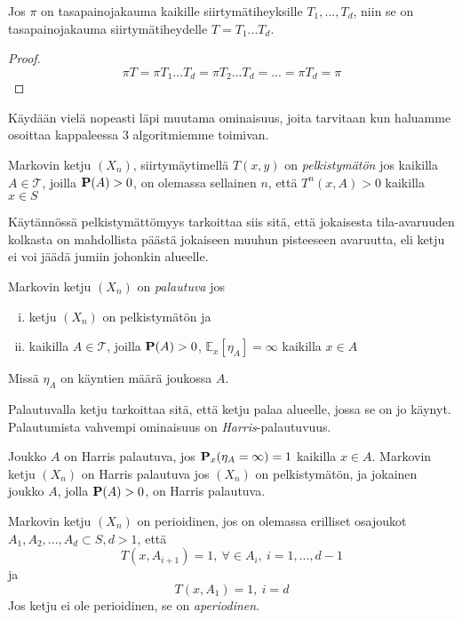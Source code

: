\begin{lause}\label{cyclic-kernel}
	Jos $\pi$ on tasapainojakauma kaikille siirtymätiheyksille $T_1,...,T_d$, niin se on tasapainojakauma siirtymätiheydelle $T = T_1...T_d$.
\end{lause}

\begin{proof}
	\begin{equation*}
		\pi T = \pi T_1...T_d = \pi T_2...T_d = ... = \pi T_d = \pi
	\end{equation*}
\end{proof}

Käydään vielä nopeasti läpi muutama ominaisuus, joita tarvitaan kun haluamme osoittaa kappaleessa 3 algoritmiemme toimivan.

\begin{maar}
	Markovin ketju $(X_n)$, siirtymäytimellä $T(x,y)$ on \textit{pelkistymätön} jos kaikilla $A \in \mathcal{T}$, joilla $\textbf{P}(A)>0$, on olemassa sellainen $n$, että $T^n(x, A)>0$ kaikilla $x\in S$
\end{maar} 

Käytännössä pelkistymättömyys tarkoittaa siis sitä, että jokaisesta tila-avaruuden kolkasta on mahdollista päästä jokaiseen muuhun pisteeseen avaruutta, eli ketju ei voi jäädä jumiin johonkin alueelle.

\begin{maar}
	Markovin ketju $(X_n)$ on \textit{palautuva} jos
	\begin{enumerate}[(i)]
		\item ketju $(X_n)$ on pelkistymätön ja
		\item kaikilla $A\in \mathcal{T}$, joilla $\textbf{P}(A)>0$, $\mathbb{E}_x [\eta_A]=\infty$ kaikilla $x\in A$
	\end{enumerate}
	Missä $\eta_A$ on käyntien määrä joukossa $A$.
\end{maar}

Palautuvalla ketju tarkoittaa sitä, että ketju palaa alueelle, jossa se on jo käynyt. Palautumista vahvempi ominaisuus on \textit{Harris}-palautuvuus.

\begin{maar}
	Joukko $A$ on Harris palautuva, jos $\textbf{P}_x(\eta_A =\infty) = 1$ kaikilla $x\in A$. Markovin ketju $(X_n)$ on Harris palautuva jos $(X_n)$ on pelkistymätön, ja jokainen joukko $A$, jolla $\textbf{P}(A)>0$, on Harris palautuva.
\end{maar}

\begin{maar}
	Markovin ketju $(X_n)$ on perioidinen, jos on olemassa erilliset osajoukot $A_1, A_2,...,A_d \subset S, d > 1$, että 
	\begin{equation}
		T(x, A_{i+1}) = 1 , \: \forall \in A_i, \: i=1,...,d-1
	\end{equation}
	ja 
	\begin{equation}
		T(x,A_1)=1, \: i = d
	\end{equation}
	Jos ketju ei ole perioidinen, se on \textit{aperiodinen}.
\end{maar}

